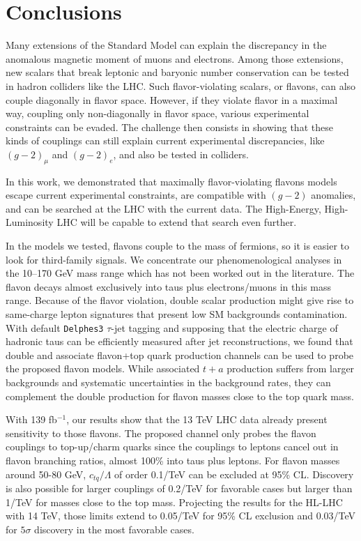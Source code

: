 \documentclass[prd,amsfonts,onecolumn,superscriptaddress,aps,nofootinbib,11pt]{revtex4-1}
\begin{document}
\section{Conclusions}\label{conclusao}

 Many extensions of the Standard Model can explain the discrepancy in the anomalous magnetic moment of muons and electrons. Among those extensions, new scalars that break leptonic and baryonic number conservation can be tested in hadron colliders like the LHC. Such flavor-violating scalars, or flavons, can also couple diagonally in flavor space. However, if they violate flavor in a maximal way, coupling only non-diagonally in flavor space, various experimental constraints can be evaded. The challenge then consists in showing that these kinds of couplings can still explain current experimental discrepancies, like $(g-2)_\mu$ and $(g-2)_e$, and also be tested in colliders.

 In this work, we demonstrated that maximally flavor-violating flavons models escape current experimental constraints, are compatible with $(g-2)$ anomalies, and can be searched at the LHC with the current data. The High-Energy, High-Luminosity LHC will be capable to extend that search even further.

 In the models we tested, flavons couple to the mass of fermions, so it is easier to look for third-family signals. We concentrate our phenomenological analyses in the 10--170 GeV mass range which has not been worked out in the literature. The flavon decays almost exclusively into taus plus electrons/muons in this mass range. Because of the flavor violation, double scalar production might give rise to same-charge lepton signatures that present low SM backgrounds contamination. With default \texttt{Delphes3} $\tau$-jet tagging and supposing that the electric charge of hadronic taus can be efficiently measured after jet reconstructions, we found that double and associate flavon+top quark production channels can be used to probe the proposed flavon models. While associated $t+a$ production suffers from larger backgrounds and systematic uncertainties in the background rates, they can complement the double production for flavon masses close to the top quark mass.

 With 139 fb$^{-1}$, our results show that the 13 TeV LHC data already present sensitivity to those flavons. The proposed channel only probes the flavon couplings to top-up/charm quarks since the couplings to leptons cancel out in flavon branching ratios, almost 100\% into taus plus leptons. For flavon masses around 50-80 GeV, $c_{tq}/\Lambda$ of order 0.1/TeV can be excluded at 95\% CL. Discovery is also possible for larger couplings of 0.2/TeV for favorable cases but larger than 1/TeV for masses close to the top mass. Projecting the results for the HL-LHC with 14 TeV, those limits extend to 0.05/TeV for 95\% CL exclusion and 0.03/TeV for $5\sigma$ discovery in the most favorable cases. 
\end{document}
